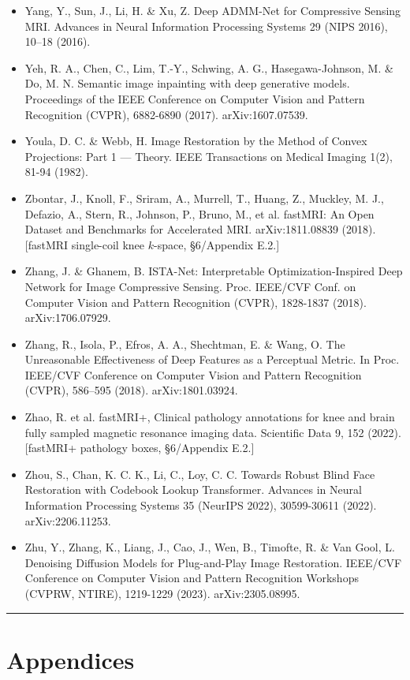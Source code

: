 \documentclass[11pt]{article}
\begin{document}
\begin{itemize}
\item Yang, Y., Sun, J., Li, H. \& Xu, Z. Deep ADMM-Net for Compressive Sensing MRI. Advances in Neural Information Processing Systems 29 (NIPS 2016), 10--18 (2016).
\item Yeh, R. A., Chen, C., Lim, T.-Y., Schwing, A. G., Hasegawa-Johnson, M. \& Do, M. N. Semantic image inpainting with deep generative models. Proceedings of the IEEE Conference on Computer Vision and Pattern Recognition (CVPR), 6882-6890 (2017). arXiv:1607.07539.
\item Youla, D. C. \& Webb, H. Image Restoration by the Method of Convex Projections: Part 1 --- Theory. IEEE Transactions on Medical Imaging 1(2), 81-94 (1982).
\item Zbontar, J., Knoll, F., Sriram, A., Murrell, T., Huang, Z., Muckley, M. J., Defazio, A., Stern, R., Johnson, P., Bruno, M., et al. fastMRI: An Open Dataset and Benchmarks for Accelerated MRI. arXiv:1811.08839 (2018). [fastMRI single-coil knee $k$-space, §6/Appendix E.2.]
\item Zhang, J. \& Ghanem, B. ISTA-Net: Interpretable Optimization-Inspired Deep Network for Image Compressive Sensing. Proc. IEEE/CVF Conf. on Computer Vision and Pattern Recognition (CVPR), 1828-1837 (2018). arXiv:1706.07929.
\item Zhang, R., Isola, P., Efros, A. A., Shechtman, E. \& Wang, O. The Unreasonable Effectiveness of Deep Features as a Perceptual Metric. In Proc. IEEE/CVF Conference on Computer Vision and Pattern Recognition (CVPR), 586--595 (2018). arXiv:1801.03924.
\item Zhao, R. et al. fastMRI+, Clinical pathology annotations for knee and brain fully sampled magnetic resonance imaging data. Scientific Data 9, 152 (2022). [fastMRI+ pathology boxes, §6/Appendix E.2.]
\item Zhou, S., Chan, K. C. K., Li, C., Loy, C. C. Towards Robust Blind Face Restoration with Codebook Lookup Transformer. Advances in Neural Information Processing Systems 35 (NeurIPS 2022), 30599-30611 (2022). arXiv:2206.11253.
\item Zhu, Y., Zhang, K., Liang, J., Cao, J., Wen, B., Timofte, R. \& Van Gool, L. Denoising Diffusion Models for Plug-and-Play Image Restoration. IEEE/CVF Conference on Computer Vision and Pattern Recognition Workshops (CVPRW, NTIRE), 1219-1229 (2023). arXiv:2305.08995.
\end{itemize}

\medskip\hrule\medskip

\clearpage\section*{Appendices}
\setcounter{figure}{0}
\end{document}
